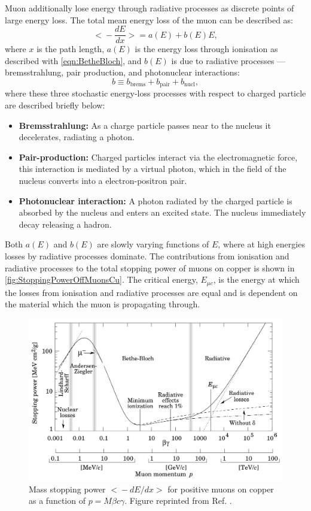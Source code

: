 Muon additionally lose energy through radiative processes as discrete points of large energy loss. The total mean energy loss of the muon can be described as:
\begin{equation}\label{eqn:totMeanEnergyLossMu}
    \Biggl<-\frac{dE}{dx}\Biggl>=a(E)+b(E)E,
\end{equation}
where $x$ is the path length, $a(E)$ is the energy loss through ionisation as described with \autoref{eqn:BetheBloch}, and $b(E)$ is due to radiative
processes — bremsstrahlung, pair production, and photonuclear interactions:
\begin{equation}\label{eqn:radproc}
    b\equiv b_{\text{brems}}+b_{\text{pair}}+b_{\text{nucl}},
\end{equation}
where these three stochastic energy-loss processes with respect to charged particle are described briefly below:
\begin{itemize}
    \item \textbf{Bremsstrahlung:} As a charge particle passes near to the nucleus it decelerates, radiating a photon.
    \item \textbf{Pair-production:} Charged particles interact via the electromagnetic force, this interaction is mediated by a virtual photon, which in the field of the nucleus converts into a electron-positron pair.
    \item \textbf{Photonuclear interaction:} A photon radiated by the charged particle is absorbed by the nucleus and enters an excited state. The nucleus immediately decay releasing a hadron.
\end{itemize}
Both $a(E)$ and $b(E)$ are slowly varying functions of $E$, where at high energies losses by radiative processes dominate. The contributions from ionisation and radiative processes to the total stopping power of muons on copper is shown in \autoref{fig:StoppingPowerOffMuonsCu}. The critical energy, $E_{\mu c}$, is the energy at which the losses from ionisation and radiative processes are equal and is dependent on the material which the muon is propagating through.
\begin{figure}
    \centering
    \includegraphics[width=0.9\linewidth]{figures/Muons/MassMuonStoppingPowerOfMuonsOnCu.png}
    \caption{Mass stopping power $\big<-dE/dx\big>$ for positive muons on copper as a function of $p=M\beta c\gamma$. Figure reprinted from Ref. \cite{GROOM2001183}.}
    \label{fig:StoppingPowerOffMuonsCu}
\end{figure}
